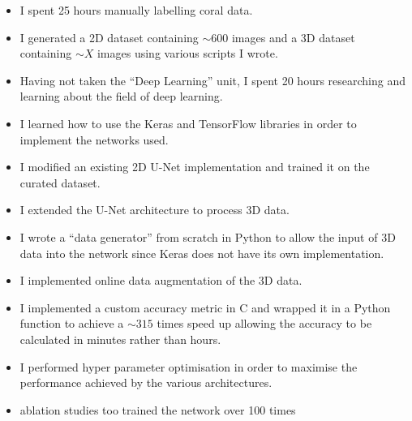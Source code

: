 \begin{itemize}
    \item I spent 25 hours manually labelling coral data.
    \item I generated a 2D dataset containing ${\sim}600$ images and a 3D dataset containing ${\sim}X$ images using various scripts I wrote.
    \item Having not taken the ``Deep Learning'' unit, I spent 20 hours researching and learning about the field of deep learning.
    \item I learned how to use the Keras and TensorFlow libraries in order to implement the networks used.
    \item I modified an existing 2D U-Net implementation and trained it on the curated dataset.
    \item I extended the U-Net architecture to process 3D data.
    \item I wrote a ``data generator'' from scratch in Python to allow the input of 3D data into the network since Keras does not have its own implementation.
    \item I implemented online data augmentation of the 3D data.
    \item I implemented a custom accuracy metric in C and wrapped it in a Python function to achieve a ${\sim}315$ times speed up allowing the accuracy to be calculated in minutes rather than hours.
    \item I performed hyper parameter optimisation in order to maximise the performance achieved by the various architectures.
    \item ablation studies too trained the network over 100 times
\end{itemize}